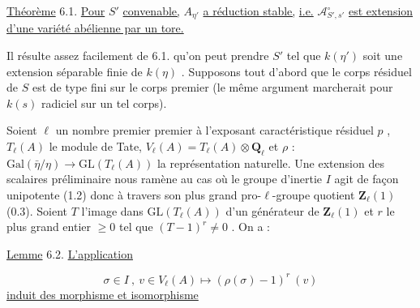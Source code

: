 \underline{Théorème} 6.1. \underline{Pour} $S'$ \underline{convenable,} $A_{\eta'}$ \underline{a réduction stable,} \underline{i.e.} $\mathcal{A}^{\circ}_{S',s'}$ \underline{est extension d'une variété abélienne par un tore.}

Il résulte assez facilement de 6.1. qu'on peut prendre $S'$ tel que $k(\eta')$ soit une extension séparable finie de $k(\eta)$ . Supposons tout d'abord que le corps résiduel de $S$ est de type fini sur le corps premier (le même argument marcherait pour $k(s)$ radiciel sur un tel corps).

Soient $\ell$ un nombre premier premier à l'exposant caractéristique résiduel $p$ , $T_{\ell}(A)$ le module de Tate, $V_{\ell}(A) = T_{\ell}(A) \otimes \mathbf{Q}_{\ell}$ et $\rho$ : $\mathrm{Gal}(\bar{\eta}/\eta) \longrightarrow \mathrm{GL}(T_{\ell}(A))$ la représentation naturelle. Une extension des scalaires préliminaire  nous ramène au cas où le groupe d'inertie $I$ agit de façon unipotente (1.2) donc à travers son plus grand pro-$\ell$-groupe quotient $\mathbf{Z}_{\ell}(1)$ (0.3). Soient $T$ l'image dans $\mathrm{GL}(T_{\ell}(A))$ d'un générateur de $\mathbf{Z}_{\ell}(1)$ et $r$ le plus grand entier $\geqslant 0$ tel que $(T-1)^{r} \neq 0$ . On a :

\underline{Lemme} 6.2. \underline{L'application}

\begin{equation*}
\sigma \in I \ , \ v \in V_{\ell}(A) \longmapsto (\rho(\sigma)-1)^{r} \ (v)
\end{equation*}
\underline{induit des morphisme et isomorphisme}

